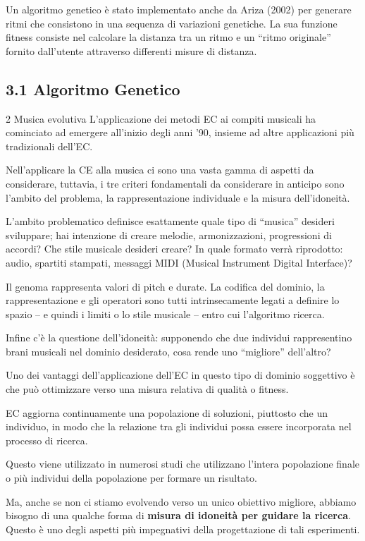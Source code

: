 \documentclass[a4paper,12pt]{report}
\begin{document}
Un algoritmo genetico è stato implementato anche da Ariza (2002) per generare ritmi che consistono in una sequenza di variazioni genetiche.
La sua funzione fitness consiste nel calcolare la distanza tra un ritmo e un “ritmo originale” fornito dall'utente attraverso differenti misure di distanza. 

\subsection*{3.1 Algoritmo Genetico}

2 Musica evolutiva
L'applicazione dei metodi EC ai compiti musicali ha cominciato ad emergere all'inizio degli anni '90, insieme ad altre applicazioni più tradizionali dell'EC. 

Nell'applicare la CE alla musica ci sono una vasta gamma di aspetti da considerare, tuttavia, i tre criteri fondamentali da considerare in anticipo sono l'ambito del problema, la rappresentazione individuale e la misura dell'idoneità. 

L’ambito problematico definisce esattamente quale tipo di “musica” desideri sviluppare; hai intenzione di creare melodie, armonizzazioni, progressioni di accordi? 
Che stile musicale desideri creare? 
In quale formato verrà riprodotto: audio, spartiti stampati, messaggi MIDI (Musical Instrument Digital Interface)? 

Il genoma rappresenta valori di pitch e durate. 
La codifica del dominio, la rappresentazione e gli operatori sono tutti intrinsecamente legati a definire lo spazio – e quindi i limiti o lo stile musicale – entro cui l'algoritmo ricerca. 

Infine c’è la questione dell’idoneità: supponendo che due individui rappresentino brani musicali nel dominio desiderato, cosa rende uno “migliore” dell’altro? 

Uno dei vantaggi dell'applicazione dell'EC in questo tipo di dominio soggettivo è che può ottimizzare verso una misura relativa di qualità o fitness. 

EC aggiorna continuamente una popolazione di soluzioni, piuttosto che un individuo, in modo che la relazione tra gli individui possa essere incorporata nel processo di ricerca. 

Questo viene utilizzato in numerosi studi che utilizzano l'intera popolazione finale o più individui della popolazione per formare un risultato. 

Ma, anche se non ci stiamo evolvendo verso un unico obiettivo migliore, abbiamo bisogno di una qualche forma di \textbf{misura di idoneità per guidare la ricerca}. 
Questo è uno degli aspetti più impegnativi della progettazione di tali esperimenti.
\end{document}
